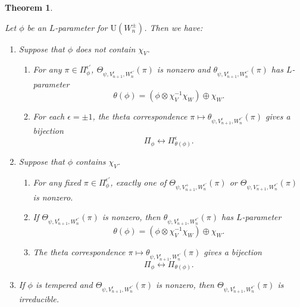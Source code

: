 \documentclass[11pt]{amsart}
\numberwithin{equation}{section}
\theoremstyle{plain}
\newtheorem{thm}{Theorem}[section]
\theoremstyle{definition}
\theoremstyle{remark}
\def\U{\mathrm{U}}
\begin{document}
\begin{thm}  \label{T:al-equal}

Let $\phi$ be an $L$-parameter for $\U(W_n^{\pm})$. Then we have:

\begin{enumerate}

\item Suppose that $\phi$ does not contain $\chi_V$.

\begin{enumerate}

 \item For any $\pi \in \Pi_{\phi}^{\epsilon'}$, 
 $\Theta_{\psi, V_{n+1}^{\epsilon}, W_n^{\epsilon'}}(\pi)$ is nonzero and $\theta_{\psi, V_{n+1}^{\epsilon}, W_n^{\epsilon'}}(\pi)$ has $L$-parameter
 \[  \theta(\phi) = (\phi \otimes \chi_V^{-1} \chi_W) \oplus  \chi_W. \]

 \item For each $\epsilon = \pm 1$, the theta correspondence $\pi \mapsto \theta_{\psi, V_{n+1}^{\epsilon}, W_n^{\epsilon'}}(\pi)$ gives a bijection
\[  \Pi_{\phi} \longleftrightarrow \Pi_{\theta(\phi)}^{\epsilon}.  \]  

\end{enumerate} 

\item Suppose that $\phi$ contains $\chi_V$.

\begin{enumerate}

\item For any fixed $\pi \in \Pi_{\phi}^{\epsilon'}$, exactly one of $\Theta_{\psi, V_{n+1}^+, W_n^{\epsilon'}}(\pi)$ or $\Theta_{\psi, V_{n+1}^-, W_n^{\epsilon'}}(\pi)$ is nonzero.

\item If $\Theta_{\psi, V_{n+1}^{\epsilon}, W_n^{\epsilon'}}(\pi)$ is nonzero, then $\theta_{\psi, V_{n+1}^{\epsilon}, W_n^{\epsilon'}}(\pi)$ has $L$-parameter
 \[  \theta(\phi) = (\phi \otimes \chi_V^{-1} \chi_W) \oplus  \chi_W. \]

\item The theta correspondence $\pi \mapsto \theta_{\psi, V_{n+1}^{\epsilon}, W_n^{\epsilon'}}(\pi)$ gives a bijection
 \[  \Pi_{\phi} \longleftrightarrow \Pi_{\theta(\phi)}. \]

\end{enumerate} 

\item If $\phi$ is tempered and $\Theta_{\psi, V_{n+1}^{\epsilon}, W_n^{\epsilon'}}(\pi)$ is nonzero, then $\Theta_{\psi, V_{n+1}^{\epsilon}, W_n^{\epsilon'}}(\pi)$ is irreducible.

\end{enumerate}

\end{thm}
\end{document}
